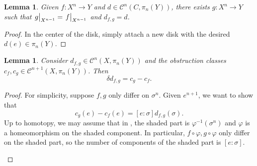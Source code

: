 \documentclass[leqno, openany]{memoir}
\newtheorem{lem}[thm]{Lemma}
\theoremstyle{definition}
\theoremstyle{remark}
\theoremstyle{plain}
\theoremstyle{definition}
\theoremstyle{remark}
\newcommand{\mc}[1]{\mathcal{#1}}
\begin{document}
\begin{lem}
    Given $f \colon X^n \to Y$ and $d \in \mc{C}^n (C, \pi_n(Y))$, there exists $g \colon X^n \to Y$ such that $\eval{g}_{X^{n-1}} = \eval{f}_{X^{n-1}}$ and $d_{f,g} = d$.
\end{lem}

\begin{proof}
    In the center of the disk, simply attach a new disk with the desired $d(e) \in \pi_n(Y)$.
\end{proof}

\begin{lem}
    Consider $d_{f,g} \in \mc{C}^n(X, \pi_n(Y))$ and the obstruction classes $c_f, c_g \in \mc{C}^{n+1}(X, \pi_n(Y))$. Then
    \[ \delta d_{f,g} = c_g - c_f. \]
\end{lem}

\begin{proof}
    For simplicity, suppose $f, g$ only differ on $\sigma^n$. Given $e^{n+1}$, we want to show that
    \[ c_g(e) - c_f(e) = [e:\sigma] d_{f,g}(\sigma). \]
    Up to homotopy, we may assume that in , the shaded part is $\varphi^{-1}(\sigma^n)$ and $\varphi$ is a homeomorphism on the shaded component. In particular, $f \circ \varphi, g \circ \varphi$ only differ on the shaded part, so the number of components of the shaded part is $[e:\sigma]$.
            \begin{figure}[htpb]
            \begin{center}
\end{center}
\end{figure}
\end{proof}
\end{document}
